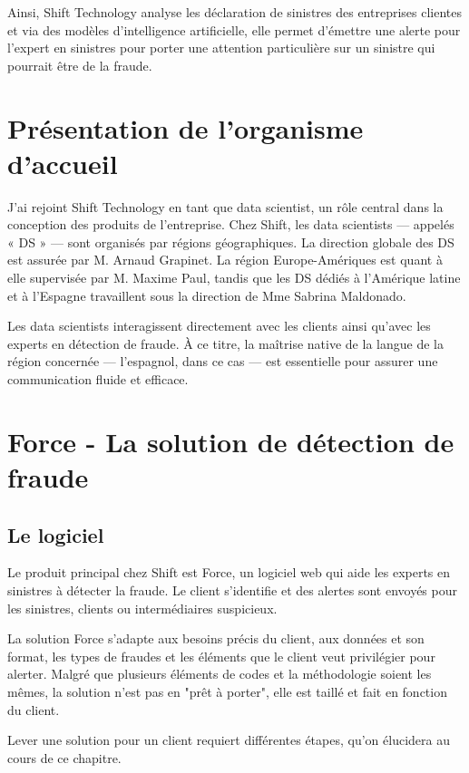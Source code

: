 \documentclass [twoside,openright,a4paper,11pt,french] {report}
\begin{document}
Ainsi, Shift Technology analyse les déclaration de sinistres des entreprises clientes 
et via des modèles d'intelligence artificielle, elle permet d'émettre une alerte pour 
l'expert en sinistres pour porter une attention particulière sur un sinistre qui pourrait être de la fraude.



\section {Présentation de l'organisme d'accueil}

J'ai rejoint Shift Technology en tant que data scientist, un rôle central dans 
la conception des produits de l'entreprise. Chez Shift, les data scientists — 
appelés « DS » — sont organisés par régions géographiques. La direction globale
des DS est assurée par M. Arnaud Grapinet. La région Europe-Amériques est quant
à elle supervisée par M. Maxime Paul, tandis que les DS dédiés à l'Amérique 
latine et à l'Espagne travaillent sous la direction de Mme Sabrina Maldonado.

Les data scientists interagissent directement avec les clients ainsi qu'avec les 
experts en détection de fraude. À ce titre, la maîtrise native de la langue de la 
région concernée — l'espagnol, dans ce cas — est essentielle pour assurer une 
communication fluide et efficace.

\section {Force - La solution de détection de fraude}

\subsection{Le logiciel}
Le produit principal chez Shift est Force, un logiciel web qui aide les experts 
en sinistres à détecter la fraude. Le client s'identifie et des alertes sont 
envoyés pour les sinistres, clients ou intermédiaires suspicieux. 

La solution Force s'adapte aux besoins précis du client, aux données et son format, 
les types de fraudes et les éléments que le client veut privilégier pour alerter.
Malgré que plusieurs éléments de codes et la méthodologie soient les mêmes,
la solution n'est pas en "prêt à porter", elle est taillé et fait en fonction
du client. 

Lever une solution pour un client requiert différentes étapes, qu'on élucidera au cours de ce chapitre. 
\end{document}
